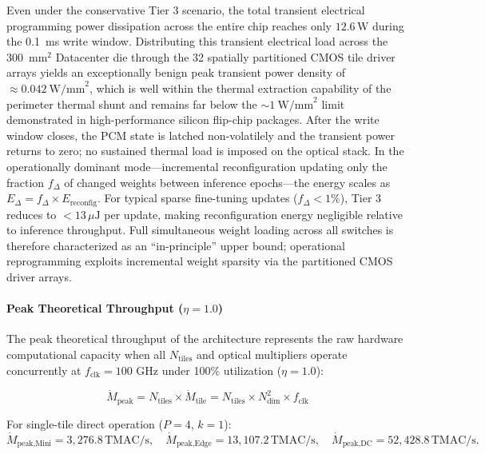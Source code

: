 \documentclass[journal]{IEEEtran}
\begin{document}
Even under the conservative Tier 3 scenario, the total transient electrical programming power dissipation across the entire chip reaches only $12.6\,\text{W}$ during the 0.1~ms write window. Distributing this transient electrical load across the 300~$\text{mm}^{2}$ Datacenter die through the 32 spatially partitioned CMOS tile driver arrays yields an exceptionally benign peak transient power density of $\approx 0.042~\text{W/mm}^{2}$, which is well within the thermal extraction capability of the perimeter thermal shunt and remains far below the $\sim 1~\text{W/mm}^{2}$ limit demonstrated in high-performance silicon flip-chip packages. After the write window closes, the PCM state is latched non-volatilely and the transient power returns to zero; no sustained thermal load is imposed on the optical stack. In the operationally dominant mode---incremental reconfiguration updating only the fraction $f_{\Delta}$ of changed weights between inference epochs---the energy scales as $E_{\Delta} = f_{\Delta} \times E_{\text{reconfig}}$. For typical sparse fine-tuning updates ($f_{\Delta} < 1\%$), Tier 3 reduces to $< 13\,\mu\text{J}$ per update, making reconfiguration energy negligible relative to inference throughput. Full simultaneous weight loading across all switches is therefore characterized as an ``in-principle'' upper bound; operational reprogramming exploits incremental weight sparsity via the partitioned CMOS driver arrays. 

\paragraph{\textbf{Peak Theoretical Throughput ($\eta = 1.0$)}}
The peak theoretical throughput of the architecture represents the raw hardware computational capacity when all $N_{\text{tiles}}$ and optical multipliers operate concurrently at $f_{\text{clk}} = 100\text{ GHz}$ under 100\% utilization ($\eta = 1.0$):

\begin{equation}
\dot{M}_{\text{peak}} = N_{\text{tiles}} \times \dot{M}_{\text{tile}} = N_{\text{tiles}} \times N_{\text{dim}}^2 \times f_{\text{clk}}
\end{equation}

For single-tile direct operation ($P=4$, $k=1$):
\begin{equation}
\dot{M}_{\text{peak,Mini}} = 3,276.8\,\text{TMAC/s}, \quad \dot{M}_{\text{peak,Edge}} = 13,107.2\,\text{TMAC/s}, \quad \dot{M}_{\text{peak,DC}} = 52,428.8\,\text{TMAC/s}.
\end{equation}
\end{document}
